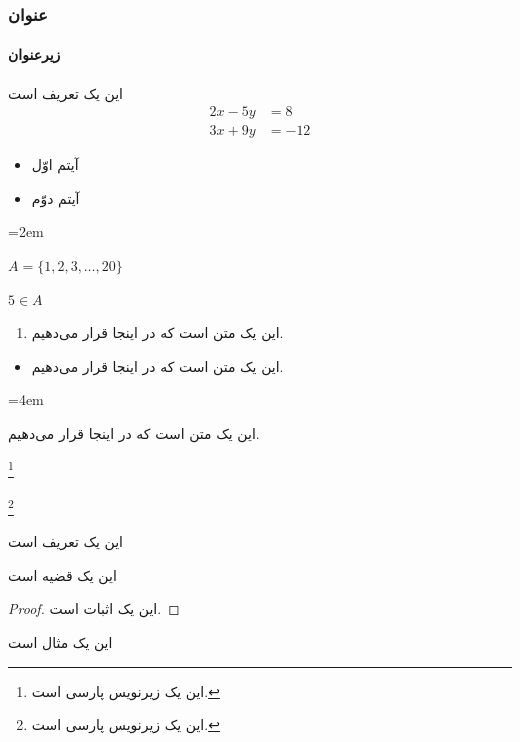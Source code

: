 \documentclass[10pt,xcolor=dvipsnames]{beamer}
\begin{document}
\begin{frame}
\frametitle{عنوان}
\framesubtitle{زیرعنوان}
\begin{definition}
این یک تعریف است 
\begin{align}
2x - 5y &=  8 \\ 
3x + 9y &=  -12
\end{align}
\begin{itemize}\raggedright
\item
 آیتم اوّل
\item
 آیتم دوّم
\end{itemize}
\ptext[1]
\begin{itemize}\itemindent=2em
\begin{LTRitems}
\item $A=\{1, 2, 3, \dots, 20\}$
\item $5\in A$
\end{LTRitems}
\end{itemize}
\end{definition}

\end{frame}
\begin{frame}
\ptext[1]
\begin{enumerate}\itemindent=2em
\item 
این یک متن است که در اینجا قرار می‌دهیم.
\end{enumerate}
\pause

\begin{itemize}\itemindent=2em
\item 
این یک متن است که در اینجا قرار می‌دهیم.
\end{itemize}

\begin{description}\itemindent=4em
\item[آزمایش]
این یک متن است که در اینجا قرار می‌دهیم.
\end{description}

\end{frame}
\begin{frame}

\footnote{این یک زیرنویس پارسی است.}%

%

%

\footnote{این یک زیرنویس پارسی است.}

\end{frame}
\begin{frame}
\ptext[1]
\begin{definition}
این یک تعریف است
\end{definition}
\pause

\begin{theorem}
این یک قضیه است
\end{theorem}
\pause

\begin{proof}
این یک اثبات است.
\end{proof}
\pause

\begin{example}
این یک مثال است
\end{example}
\end{frame}
\end{document}
